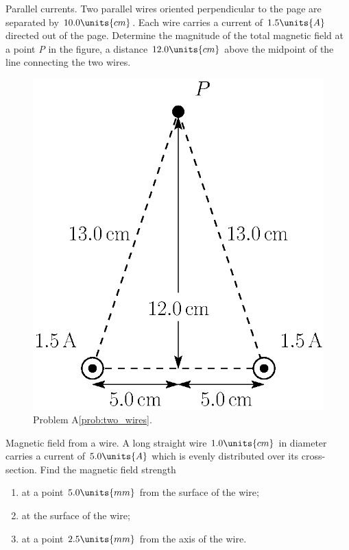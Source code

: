 \begin{aproblem}{Parallel currents.}
  Two parallel wires oriented perpendicular to the page are separated
  by $10.0\units{cm}$.  Each wire carries a current of $1.5\units{A}$
  directed out of the page.  Determine the magnitude of the total
  magnetic field at a point {\em P} in the figure, a distance
  $12.0\units{cm}$ above the midpoint of the line connecting the two
  wires.
  \label{prob:two_wires}
  \begin{figure}[h]
    \begin{center}
      \includegraphics[width=2.in]{additional_problems/two_wires}
    \end{center}
    \caption{Problem A\ref{prob:two_wires}.}
  \end{figure}
\end{aproblem}


\begin{aproblem}{Magnetic field from a wire.}
  A long straight wire $1.0\units{cm}$ in diameter carries a current
  of $5.0\units{A}$ which is evenly distributed over its
  cross-section.  Find the magnetic field strength
  \begin{enumerate}
  \item at a point $5.0\units{mm}$ from the surface of the wire;
  \item at the surface of the wire;
  \item at a point $2.5\units{mm}$ from the axis of the wire.	
  \end{enumerate}
  \label{prob:ampere_wire}
\end{aproblem}


